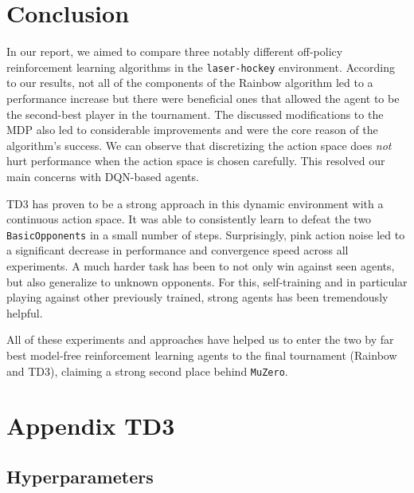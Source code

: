 \documentclass[11pt]{article}
\begin{document}






\section{Conclusion}

In our report, we aimed to compare three notably different off-policy reinforcement learning algorithms in the \texttt{laser-hockey} environment. According to our results, not all of the components of the Rainbow algorithm led to a performance increase but there were beneficial ones that allowed the agent to be the second-best player in the tournament. The discussed modifications to the MDP also led to considerable improvements and were the core reason of the algorithm's success. We can observe that discretizing the action space does \emph{not} hurt performance when the action space is chosen carefully. This resolved our main concerns with DQN-based agents.

TD3 has proven to be a strong approach in this dynamic environment with a continuous action space. It was able to consistently learn to defeat the two \texttt{BasicOpponents} in a small number of steps. Surprisingly, pink action noise led to a significant decrease in performance and convergence speed across all experiments. A much harder task has been to not only win against seen agents, but also generalize to unknown opponents. For this, self-training and in particular playing against other previously trained, strong agents has been tremendously helpful.

All of these experiments and approaches have helped us to enter the two by far best model-free reinforcement learning agents to the final tournament (Rainbow and TD3), claiming a strong second place behind \texttt{MuZero}.




\appendix

\newpage\null

\section{Appendix TD3}

\subsection{Hyperparameters}
\end{document}
